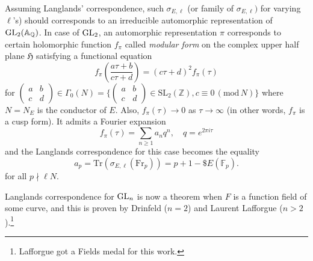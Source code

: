 Assuming Langlands' correspondence, such $\sigma_{E, \ell}$ (or family of $\sigma_{E, \ell})$ for varying $\ell$'s) should corresponds
to an irreducible automorphic representation of $\operatorname{\mathrm{GL}}_{2}(\mathbb{A}_{\mathbb{Q}})$.
In case of $\operatorname{\mathrm{GL}}_{2}$, an automorphic representation $\pi$ corresponds to certain holomorphic function $f_{\pi}$ called \emph{modular form} on
the complex upper half plane $\mathfrak{H}$ satisfying a functional equation
$$
    f_{\pi} \left(\frac{a\tau + b}{c\tau + d}\right) = (c\tau + d)^{2}f_{\pi}(\tau)
$$
for $(\begin{smallmatrix} a & b \\ c & d\end{smallmatrix}) \in \Gamma_{0}(N) = \{(\begin{smallmatrix} a &b \\ c & d\end{smallmatrix}) \in \mathrm{SL}_{2}(\mathbb{Z}), c\equiv 0\,(\mathrm{mod}\,N)\}$
where $N = N_{E}$ is the conductor of $E$.
Also, $f_{\pi}(\tau)  \to 0$ as $\tau \to \infty$ (in other words, $f_{\pi}$ is a cusp form).
It admits a Fourier expansion
$$
    f_{\pi}(\tau) = \sum_{n\geq 1} a_{n} q^{n}, \quad q = e^{2 \pi i \tau}
$$
and the Langlands correspondence for this case becomes the equality
$$
a_{p} = \mathrm{Tr}(\sigma_{E, \ell}(\mathrm{Fr}_p)) = p + 1 - \$ E(\mathbb{F}_{p}).
$$
for all $p \nmid \ell N$.

Langlands correspondence for $\operatorname{\mathrm{GL}}_n$ is now a theorem when $F$ is a function field of some curve, and this is proven by Drinfeld ($n = 2$) and Laurent Lafforgue ($n>2$).\footnote{Lafforgue got a Fields medal for this work.}
